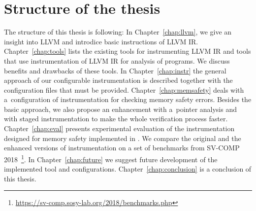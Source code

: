 \section{Structure of the thesis}

The structure of this thesis is following: In Chapter~\ref{chap:llvm}, we give
an insight into LLVM and introdice basic instructions of LLVM IR.
Chapter~\ref{chap:tools} lists the existing tools for instrumenting LLVM IR and
tools that use instrumentation of LLVM IR for analysis of programs. We discuss
benefits and drawbacks of these tools. In Chapter~\ref{chap:instr} the general
approach of our configurable instrumentation is described together with the
configuration files that must be provided. Chapter~\ref{chap:memsafety} deals
with a~configuration of instrumentation for checking memory safety errors.
Besides the basic approach, we also propose an enhancement with a~pointer
analysis and with staged instrumentation to make the whole verification process
faster. Chapter~\ref{chap:eval} presents experimental evaluation of the
instrumentation designed for memory safety implemented in \symbiotic. We
compare the original and the enhanced versions of instrumentation on a set of
benchmarks from SV-COMP
2018~\footnote{\url{https://sv-comp.sosy-lab.org/2018/benchmarks.php}}.  In
Chapter~\ref{chap:future} we suggest future development of the implemented tool
and configurations. Chapter~\ref{chap:conclusion} is a conclusion of this
thesis.
